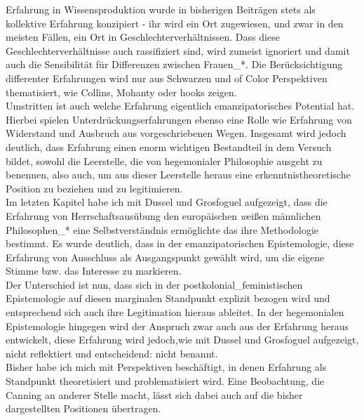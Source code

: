 \noindent Erfahrung in Wissensproduktion wurde in bisherigen Beiträgen stets als
kollektive Erfahrung konzipiert - ihr wird ein Ort zugewiesen, und zwar in den
meisten Fällen, ein Ort in Geschlechterverhältnissen. Dass diese
Geschlechterverhältnisse auch rassifiziert sind, wird zumeist ignoriert und
damit auch die Sensibilität für Differenzen zwischen Frauen\_*. Die
Berücksichtigung differenter Erfahrungen wird nur aus Schwarzen und of Color
Perspektiven thematisiert, wie Collins, Mohanty oder hooks zeigen.\\
Umstritten ist auch welche Erfahrung eigentlich emanzipatorisches Potential
hat. Hierbei spielen Unterdrückungserfahrungen ebenso eine Rolle wie Erfahrung
von Widerstand und Ausbruch aus vorgeschriebenen Wegen. Insgesamt wird jedoch
deutlich, dass Erfahrung einen enorm wichtigen Bestandteil in dem Versuch
bildet, sowohl die Leerstelle, die von hegemonialer Philosophie ausgeht zu
benennen, also auch, um aus dieser Leerstelle heraus eine
erkenntnistheoretische Position zu beziehen und zu legitimieren.\\

\noindent Im letzten Kapitel habe ich mit Dussel und Grosfoguel aufgezeigt, dass die
Erfahrung von Herrschaftsausübung den europäischen \textit{w}eißen männlichen
Philosophen\_* eine Selbstverständnis ermöglichte das ihre Methodologie bestimmt.
Es wurde deutlich, dass in der emanzipatorischen Epistemologie, diese Erfahrung
von Ausschluss als Ausgangspunkt gewählt wird, um die eigene Stimme bzw. das
Interesse zu markieren. \\
Der Unterschied ist nun, dass sich in der
postkolonial\_feministischen Epistemologie auf diesen marginalen Standpunkt
explizit bezogen wird und entsprechend sich auch ihre Legitimation hieraus
ableitet. In der hegemonialen Epistemologie hingegen wird der Anspruch zwar
auch aus der Erfahrung heraus entwickelt, diese Erfahrung wird jedoch,wie mit Dussel und Grosfoguel
aufgezeigt, nicht reflektiert und entscheidend:
nicht benannt.\\
           
\noindent Bisher habe ich mich mit Perspektiven beschäftigt, in denen Erfahrung als
Standpunkt theoretisiert und problematisiert wird. Eine Beobachtung, die
Canning an anderer Stelle\footnotemark {} macht, lässt sich dabei auch
auf die bisher dargestellten Positionen übertragen.\\
 
